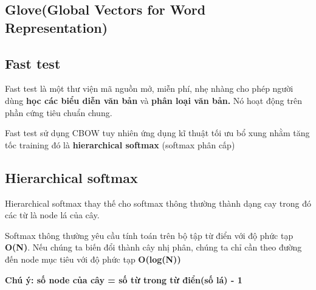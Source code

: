 \documentclass[final,letterpaper,twoside,12pt]{report}
\begin{document}



\subsection{Glove(Global Vectors for Word Representation)}



\subsection{Fast test}

Fast test là một thư viện mã nguồn mở, miễn phí, nhẹ nhàng cho phép người dùng \textbf{học các biểu diễn văn bản} và \textbf{phân loại văn bản.} Nó hoạt động trên phần cứng tiêu chuẩn chung.

Fast test sử dụng CBOW tuy nhiên ứng dụng kĩ thuật tối ưu bổ xung nhằm tăng tốc training đó là \textbf{hierarchical softmax} (softmax phân cấp)

\subsection{Hierarchical softmax}

Hierarchical softmax thay thế cho softmax thông thường thành dạng cay trong đó các từ là node lá của cây.

Softmax thông thường yêu cầu tính toán trên bộ tập từ điển với độ phức tạp \textbf{O(N)}. Nếu chúng ta biến đổi thành cây nhị phân, chúng ta chỉ cần theo đường đến node mục tiêu với độ phức tạp \textbf{O(log(N))}

\textbf{\color{red}Chú ý: số node của cây = số từ trong từ điển(số lá) - 1}
\end{document}
